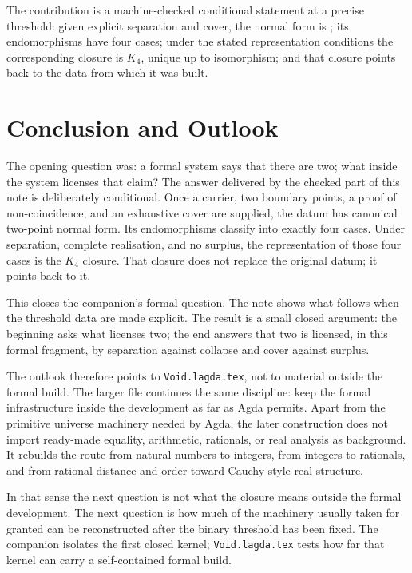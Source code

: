 \documentclass[11pt]{article}
\begin{document}
The contribution is a machine-checked conditional statement at a precise
threshold: given explicit separation and cover, the normal form is
; its endomorphisms have four cases; under the stated
representation conditions the corresponding closure is $K_4$, unique up
to isomorphism; and that closure points back to the data from which it
was built.

\section{Conclusion and Outlook}

The opening question was: a formal system says that there are two; what
inside the system licenses that claim?  The answer delivered by the
checked part of this note is deliberately conditional.  Once a carrier,
two boundary points, a proof of non-coincidence, and an exhaustive cover
are supplied, the datum has canonical two-point normal form.  Its
endomorphisms classify into exactly four cases.  Under separation,
complete realisation, and no surplus, the representation of those four
cases is the $K_4$ closure.  That closure does not replace the original
datum; it points back to it.

This closes the companion's formal question.  The note shows what
follows when the threshold data are made explicit.  The result is a
small closed argument: the beginning asks what licenses two; the end
answers that two is licensed, in this formal fragment, by separation
against collapse and cover against surplus.

The outlook therefore points to \texttt{Void.lagda.tex}, not to material
outside the formal build.  The larger file continues the same discipline:
keep the formal infrastructure inside the development as far as Agda
permits.  Apart from the primitive universe machinery needed by Agda,
the later construction does not import ready-made equality, arithmetic,
rationals, or real analysis as background.  It rebuilds the route from
natural numbers to integers, from integers to rationals, and from
rational distance and order toward Cauchy-style real structure.

In that sense the next question is not what the closure means outside
the formal development.  The next question is how much of the machinery
usually taken for granted can be reconstructed after the binary
threshold has been fixed.  The companion isolates the first closed
kernel; \texttt{Void.lagda.tex} tests how far that kernel can carry a
self-contained formal build.
\end{document}
